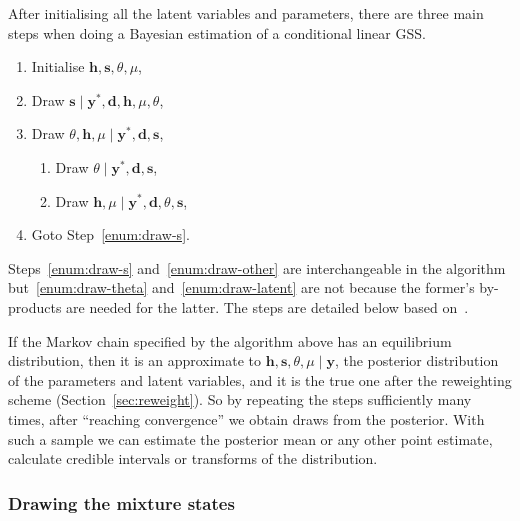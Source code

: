 After initialising all the latent variables and parameters, there are three main steps when doing a Bayesian estimation of a conditional linear GSS.
\begin{enumerate}[start=0]
	\item Initialise $\bm h,\bm s,\theta,\mu$,
	\item Draw $\bm{s}\mid\bm{y}^\ast,\bm{d},\bm{h},\mu,\theta$\label{enum:draw-s},
	\item Draw $\theta,\bm h,\mu\mid\bm y^\ast,\bm d,\bm s$\label{enum:draw-other},
	\begin{enumerate}
		\item Draw $\theta\mid\bm{y}^\ast,\bm{d},\bm s$\label{enum:draw-theta},
		\item Draw $\bm{h},\mu\mid\bm{y}^\ast,\bm{d},\theta,\bm s$\label{enum:draw-latent},
	\end{enumerate}
	\item Goto Step~\ref{enum:draw-s}.
\end{enumerate}
Steps~\ref{enum:draw-s} and~\ref{enum:draw-other} are interchangeable in the algorithm but~\ref{enum:draw-theta} and~\ref{enum:draw-latent} are not because the former's by-products are needed for the latter.
The steps are detailed below based on~\citet{Omori2007}.

If the Markov chain specified by the algorithm above has an equilibrium distribution, then it is an approximate to $\bm h,\bm s,\theta,\mu\mid\bm y$, the posterior distribution of the parameters and latent variables, and it is the true one after the reweighting scheme (Section~\ref{sec:reweight}).
So by repeating the steps sufficiently many times, after ``reaching convergence'' we obtain draws from the posterior.
With such a sample we can estimate the posterior mean or any other point estimate, calculate credible intervals or transforms of the distribution.

\subsubsection{Drawing the mixture states}

